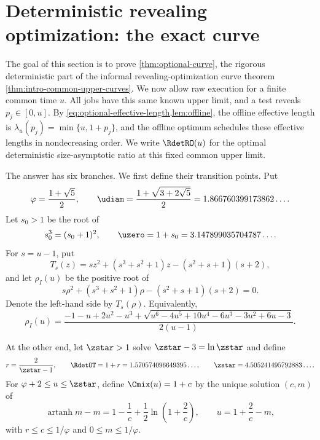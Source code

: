 \section{Deterministic revealing optimization: the exact curve}
\label{sec:optional}

The goal of this section is to prove \cref{thm:optional-curve}, the rigorous
deterministic part of the informal revealing-optimization curve theorem
\cref{thm:intro-common-upper-curves}.  We now allow raw execution for a
finite common time $u$.  All jobs have this same known upper limit, and a
test reveals $p_j\in[0,u]$.  By
\cref{eq:optional-effective-length,lem:offline}, the offline effective length
is $\lambda_u(p_j)=\min\{u,1+p_j\}$, and the offline optimum schedules these
effective lengths in nondecreasing order.  We write $\RdetRO(u)$ for the optimal
deterministic size-asymptotic ratio at this fixed common upper limit.

The answer has six branches.  We first define their transition points.  Put
\begin{equation}
 \varphi=\frac{1+\sqrt5}{2},
 \qquad
 \udiam=\frac{1+\sqrt{3+2\sqrt5}}2
 =1.866760399173862\ldots .
 \label{eq:opt:phi-udiamond}
\end{equation}
Let $s_0>1$ be the root of
\begin{equation}
 s_0^3=(s_0+1)^2,
 \qquad
 \uzero=1+s_0=3.147899035704787\ldots .
 \label{eq:opt:u0}
\end{equation}
For $s=u-1$, put
\begin{equation}
 T_s(z)=sz^2+(s^3+s^2+1)z-(s^2+s+1)(s+2),
 \label{eq:opt:Ts}
\end{equation}
and let $\rho_I(u)$ be the positive root of
\begin{equation}
s\rho^2+(s^3+s^2+1)\rho-(s^2+s+1)(s+2)=0.
\label{eq:opt:rhoI-equation}
\end{equation}
Denote the left-hand side by $T_s(\rho)$.
Equivalently,
\begin{equation}
 \rho_I(u)=
 \frac{-1-u+2u^2-u^3+
 \sqrt{u^6-4u^5+10u^4-6u^3-3u^2+6u-3}}
 {2(u-1)}.
 \label{eq:opt:rhoI-explicit}
\end{equation}

At the other end, let $\zstar>1$ solve $\zstar-3=\ln \zstar$ and define
\begin{equation}
 r=\frac2{\zstar-1},
 \qquad
 \RdetOT=1+r=1.570574096649395\ldots,
 \qquad
 \zstar=4.505241495792883\ldots .
 \label{eq:opt:obligatory-constant}
\end{equation}
For $\varphi+2\le u\le \zstar$, define $\Cmix(u)=1+c$ by the unique
solution $(c,m)$ of
\begin{equation}
 \operatorname{artanh}m-m
 =1-\frac1c+\frac12\ln\!\left(1+\frac2c\right),
 \qquad
 u=1+\frac2c-m,
 \label{eq:opt:mixed-parametrization}
\end{equation}
with $r\le c\le1/\varphi$ and $0\le m\le1/\varphi$.

